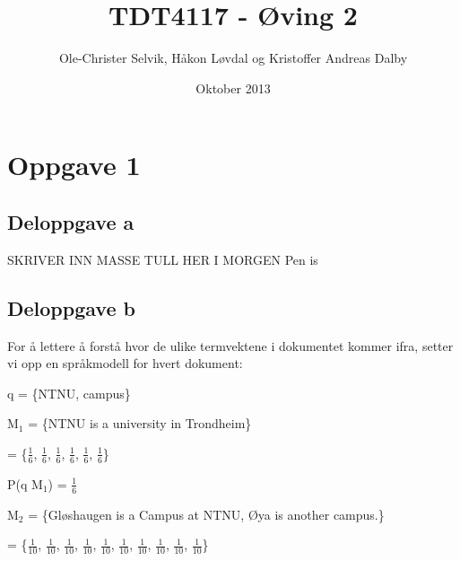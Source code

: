 \documentclass[]{article}
\begin{document}
\title{TDT4117 - Øving 2}
\author{Ole-Christer Selvik, Håkon Løvdal og Kristoffer Andreas Dalby}
\date{Oktober 2013}
\maketitle

\pagebreak

\section*{Oppgave 1}
\subsection*{Deloppgave a}

SKRIVER INN MASSE TULL HER I MORGEN
Pen is

\subsection*{Deloppgave b}

For å lettere å forstå hvor de ulike termvektene i dokumentet kommer ifra, setter vi opp en språkmodell for hvert dokument:

\vspace{2mm}

q = \{NTNU, campus\}

\vspace{2mm}

M$_{1}$ = \{NTNU is a university in Trondheim\}

\vspace{2mm}

\hspace{3.2ex} = \{$\frac{1}{6}$, $\frac{1}{6}$, $\frac{1}{6}$, $\frac{1}{6}$, $\frac{1}{6}$, $\frac{1}{6}$\}

\vspace{2mm}

P(q \textbar M$_{1}$) = $\frac{1}{6}$

\vspace{5mm}

M$_{2}$ = \{Gløshaugen is a Campus at NTNU, Øya is another campus.\}\footnotemark[1]

\vspace{2mm}

\hspace{3.2ex} = \{$\frac{1}{10}$, $\frac{1}{10}$, $\frac{1}{10}$, $\frac{1}{10}$, $\frac{1}{10}$, $\frac{1}{10}$, $\frac{1}{10}$, $\frac{1}{10}$, $\frac{1}{10}$, $\frac{1}{10}$\}
\end{document}
